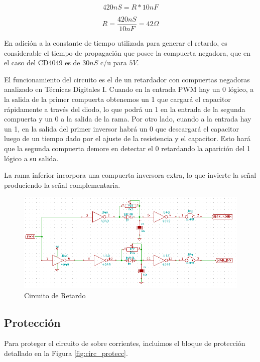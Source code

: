 \documentclass[11pt, a4paper]{article}
\begin{document}
\begin{equation}
420 nS = R * 10 nF
\end{equation}

\begin{equation}
R = \frac{420 nS}{10 nF} = 42 \Omega
\end{equation}

En adición a la constante de tiempo utilizada para generar el retardo, es considerable el tiempo de propagación que posee la compuerta negadora, que en el caso del CD4049 es de $30nS$ c/u para $5V$.

El funcionamiento del circuito es el de un retardador con compuertas negadoras analizado en Técnicas Digitales I. Cuando en la entrada PWM hay un 0 lógico, a la salida de la primer compuerta obtenemos un 1 que cargará el capacitor rápidamente a través del diodo, lo que podrá un 1 en la entrada de la segunda compuerta y un 0 a la salida de la rama. Por otro lado, cuando a la entrada hay un 1, en la salida del primer inversor habrá un 0 que descargará el capacitor luego de un tiempo dado por el ajuste de la resistencia y el capacitor. Esto hará que la segunda compuerta demore en detectar el 0 retardando la aparición del 1 lógico a su salida.

La rama inferior incorpora una compuerta inversora extra, lo que invierte la señal produciendo la señal complementaria.



\begin{figure}[h]
	\centering
	\includegraphics[width=13cm]{Imagenes/circ_retardo.png}
	\caption{Circuito de Retardo}
	\label{fig:circ_retardo}
\end{figure} 


\subsection{Protección}\label{sec:proteccion}

Para proteger el circuito de sobre corrientes, incluimos el bloque de protección detallado en la Figura \ref{fig:circ_protecc}.
\end{document}
